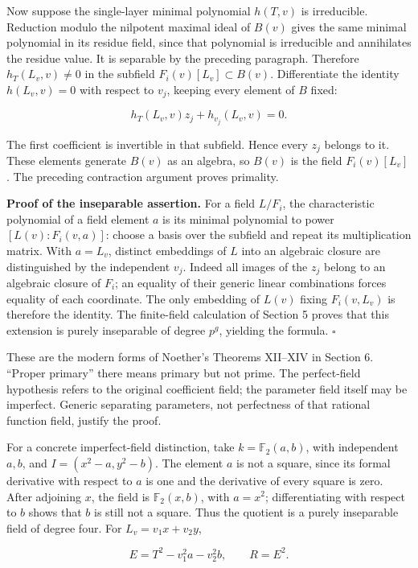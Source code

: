 \documentclass[
]{article}
\begin{document}
Now suppose the single-layer minimal polynomial \(h(T,v)\) is
irreducible. Reduction modulo the nilpotent maximal ideal of \(B(v)\)
gives the same minimal polynomial in its residue field, since that
polynomial is irreducible and annihilates the residue value. It is
separable by the preceding paragraph. Therefore \(h_T(L_v,v)\ne0\) in
the subfield \(F_i(v)[L_v]\subset B(v)\). Differentiate the identity
\(h(L_v,v)=0\) with respect to \(v_j\), keeping every element of \(B\)
fixed:

\[
h_T(L_v,v)z_j+h_{v_j}(L_v,v)=0.
\]

The first coefficient is invertible in that subfield. Hence every
\(z_j\) belongs to it. These elements generate \(B(v)\) as an algebra,
so \(B(v)\) is the field \(F_i(v)[L_v]\). The preceding contraction
argument proves primality.

\textbf{Proof of the inseparable assertion.} For a field \(L/F_i\), the
characteristic polynomial of a field element \(a\) is its minimal
polynomial to power \([L(v):F_i(v,a)]\): choose a basis over the
subfield and repeat its multiplication matrix. With \(a=L_v\), distinct
embeddings of \(L\) into an algebraic closure are distinguished by the
independent \(v_j\). Indeed all images of the \(z_j\) belong to an
algebraic closure of \(F_i\); an equality of their generic linear
combinations forces equality of each coordinate. The only embedding of
\(L(v)\) fixing \(F_i(v,L_v)\) is therefore the identity. The
finite-field calculation of Section 5 proves that this extension is
purely inseparable of degree \(p^g\), yielding the formula. \(\square\)

These are the modern forms of Noether's Theorems XII--XIV in Section 6.
``Proper primary'' there means primary but not prime. The perfect-field
hypothesis refers to the original coefficient field; the parameter field
itself may be imperfect. Generic separating parameters, not perfectness
of that rational function field, justify the proof.

For a concrete imperfect-field distinction, take \(k=\mathbb F_2(a,b)\),
with independent \(a,b\), and \(I=(x^2-a,y^2-b)\). The element \(a\) is
not a square, since its formal derivative with respect to \(a\) is one
and the derivative of every square is zero. After adjoining \(x\), the
field is \(\mathbb F_2(x,b)\), with \(a=x^2\); differentiating with
respect to \(b\) shows that \(b\) is still not a square. Thus the
quotient is a purely inseparable field of degree four. For
\(L_v=v_1x+v_2y\),

\[
E=T^2-v_1^2a-v_2^2b,\qquad R=E^2.
\]
\end{document}
